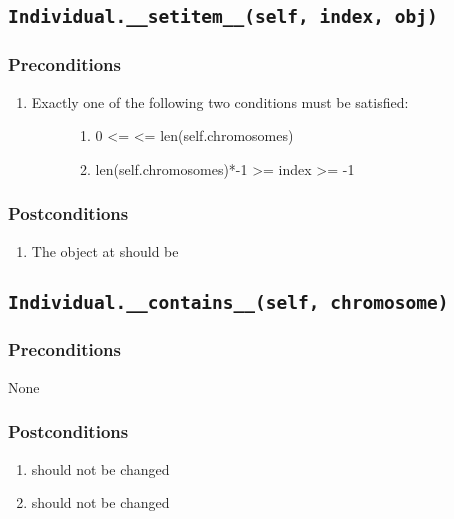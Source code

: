\documentclass[letterpaper,10pt,english]{sphinxmanual}
\begin{document}
\subsection{\texttt{Individual.\_\_setitem\_\_(self, index, obj)}}
\label{contracts:individual-setitem-self-index-obj}

\subsubsection{Preconditions}
\label{contracts:id7}\begin{enumerate}
\item {} \begin{description}
\item[{Exactly one of the following two conditions must be satisfied:}] \leavevmode\begin{enumerate}
\item {} 
0 \textless{}=  \textless{}= len(self.chromosomes)

\item {} 
len(self.chromosomes)*-1 \textgreater{}= index \textgreater{}= -1

\end{enumerate}

\end{description}

\end{enumerate}


\subsubsection{Postconditions}
\label{contracts:id8}\begin{enumerate}
\item {} 
The object at  should be 

\end{enumerate}


\subsection{\texttt{Individual.\_\_contains\_\_(self, chromosome)}}
\label{contracts:individual-contains-self-chromosome}

\subsubsection{Preconditions}
\label{contracts:id9}
None


\subsubsection{Postconditions}
\label{contracts:id10}\begin{enumerate}
\item {} 
 should not be changed

\item {} 
 should not be changed

\end{enumerate}
\end{document}
